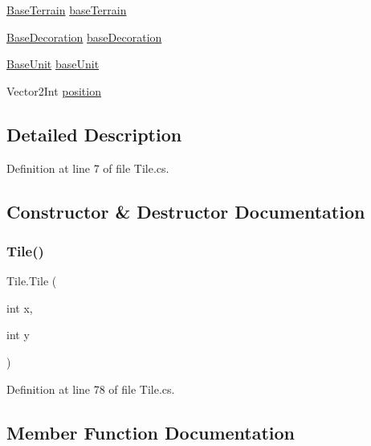 \begin{DoxyCompactItemize}
\item 
\mbox{\hyperlink{class_base_terrain}{Base\+Terrain}} \mbox{\hyperlink{class_tile_a36dba2c580e50ce450df4a0b58d69130}{base\+Terrain}}
\item 
\mbox{\hyperlink{class_base_decoration}{Base\+Decoration}} \mbox{\hyperlink{class_tile_a73a26ee1d73d9418cf55d4a8ec585910}{base\+Decoration}}
\item 
\mbox{\hyperlink{class_base_unit}{Base\+Unit}} \mbox{\hyperlink{class_tile_a2d5020851ac36840a83e8933da9c2b1e}{base\+Unit}}
\item 
Vector2\+Int \mbox{\hyperlink{class_tile_aa4046f981671278e33441b6f001b3e9e}{position}}
\end{DoxyCompactItemize}


\subsection{Detailed Description}


Definition at line 7 of file Tile.\+cs.



\subsection{Constructor \& Destructor Documentation}
\mbox{\label{class_tile_ac4b178062ea8879968150b8a79830267}} 
\subsubsection{\texorpdfstring{Tile()}{Tile()}}
{\footnotesize\ttfamily Tile.\+Tile (\begin{DoxyParamCaption}\item[{int}]{x,  }\item[{int}]{y }\end{DoxyParamCaption})}



Definition at line 78 of file Tile.\+cs.



\subsection{Member Function Documentation}
\mbox{\label{class_tile_a87c523416006468a2791d61bf3be54ca}} 
